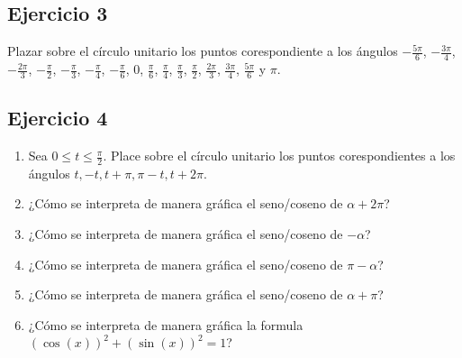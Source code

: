 \begin{center}
\end{center}

\subsection{Ejercicio 3}

Plazar sobre el círculo unitario los puntos corespondiente a los 
  ángulos
    $-\frac{5\pi}{6}$,
    $-\frac{3\pi}{4}$,
    $-\frac{2\pi}{3}$,
    $-\frac{\pi}{2}$,
    $-\frac{\pi}{3}$,
    $-\frac{\pi}{4}$,
    $-\frac{\pi}{6}$,
    $0$,
    $\frac{\pi}{6}$,
    $\frac{\pi}{4}$,
    $\frac{\pi}{3}$,
    $\frac{\pi}{2}$,
    $\frac{2\pi}{3}$,
    $\frac{3\pi}{4}$,
    $\frac{5\pi}{6}$ y
    $\pi$.

\subsection{Ejercicio 4}

\begin{enumerate}
\item Sea $0 \leq t \leq \frac{\pi}{2}$. Place sobre el círculo unitario
  los puntos corespondientes a los ángulos $t, -t, t+\pi, \pi-t, t+2\pi$.
\item ¿Cómo se interpreta de manera gráfica el seno/coseno de $\alpha+2\pi$?
\item ¿Cómo se interpreta de manera gráfica el seno/coseno de $-\alpha$?
\item ¿Cómo se interpreta de manera gráfica el seno/coseno de $\pi-\alpha$?
\item ¿Cómo se interpreta de manera gráfica el seno/coseno de $\alpha+\pi$?
\item ¿Cómo se interpreta de manera gráfica la formula
  ${\left(\cos \left( x \right)\right)}^2 + {\left(\sin \left( x \right)\right)}^2 = 1$?
\end{enumerate}

